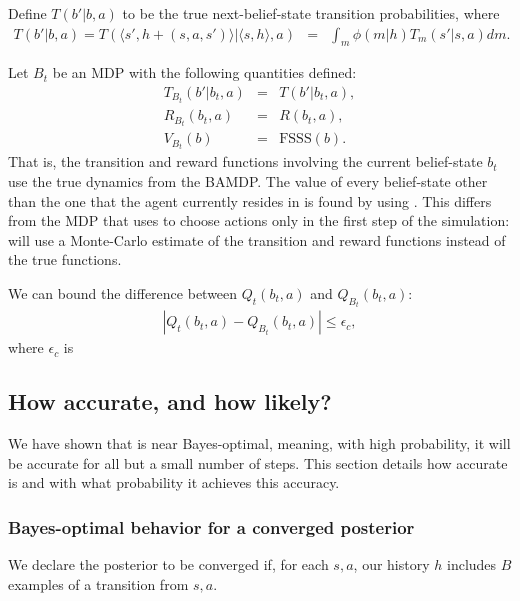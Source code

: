 \begin{lemma}
\label{sec:bfs3:lemma:opt-steps}
Define $T(b'|b,a)$ to be the true next-belief-state transition probabilities, where
\begin{eqnarray}
T(b'|b,a) = T(\langle s', h+(s,a,s')\rangle|\langle s, h \rangle, a) &=& \int_m \phi(m|h) T_m(s'|s,a) dm.
\end{eqnarray}

Let $B_t$ be an MDP with the following quantities defined:
\begin{eqnarray}
T_{B_t}(b'|b_t,a) &=& T(b'|b_t,a),\\
R_{B_t}(b_t,a) &=& R(b_t,a),\\
V_{B_t}(b) &=& \mbox{FSSS}(b).
\end{eqnarray}
That is, the transition and reward functions involving the current belief-state $b_t$ use the true dynamics from the BAMDP. The value of every belief-state other than the one that the agent currently resides in is found by using . This differs from the MDP that  uses to choose actions only in the first step of the simulation:  will use a Monte-Carlo estimate of the transition and reward functions instead of the true functions.

We can bound the difference between $Q_t(b_t,a)$ and $Q_{B_t}(b_t,a)$:
\begin{eqnarray}
|Q_t(b_t,a) - Q_{B_t}(b_t,a)| \leq \epsilon_c,
\end{eqnarray}
where $\epsilon_c$ is 
\end{lemma}

\subsection{How accurate, and how likely?}

We have shown that  is near Bayes-optimal, meaning, with high probability, it will be accurate for all but a small number of steps. This section details how accurate  is and with what probability it achieves this accuracy.

\subsubsection{Bayes-optimal behavior for a converged posterior}
\label{sec-conv}
We declare the posterior to be converged if, for each $s,a$, our history $h$ includes $B$ examples of a transition from $s,a$.

